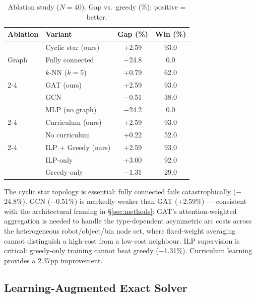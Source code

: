 \documentclass[conference]{IEEEtran}
\begin{document}
\begin{table}[htbp]
\caption{Ablation study ($N{=}40$). Gap vs.\ greedy (\%): positive = better.}
\label{tab:ablations}
\centering
\begin{tabular}{@{}llcc@{}}
\toprule
\textbf{Ablation} & \textbf{Variant} & \textbf{Gap (\%)} & \textbf{Win (\%)} \\
\midrule
\multirow{3}{*}{Graph}
    & Cyclic star (ours) & +2.59 & 93.0 \\
    & Fully connected & $-$24.8 & 0.0 \\
    & $k$-NN ($k{=}5$) & +0.79 & 62.0 \\
\cmidrule(l){2-4}
\multirow{3}{*}{Encoder}
    & GAT (ours) & +2.59 & 93.0 \\
    & GCN & $-$0.51 & 38.0 \\
    & MLP (no graph) & $-$24.2 & 0.0 \\
\cmidrule(l){2-4}
\multirow{2}{*}{Curriculum}
    & Curriculum (ours) & +2.59 & 93.0 \\
    & No curriculum & +0.22 & 52.0 \\
\cmidrule(l){2-4}
\multirow{3}{*}{Supervision}
    & ILP + Greedy (ours) & +2.59 & 93.0 \\
    & ILP-only & +3.00 & 92.0 \\
    & Greedy-only & $-$1.31 & 29.0 \\
\bottomrule
\end{tabular}
\end{table}

The cyclic star topology is essential: fully connected fails catastrophically ($-$24.8\%). GCN ($-$0.51\%) is markedly weaker than GAT ($+$2.59\%) — consistent with the architectural framing in \S\ref{sec:methods}: GAT's attention-weighted aggregation is needed to handle the type-dependent asymmetric arc costs across the heterogeneous robot/object/bin node set, where fixed-weight averaging cannot distinguish a high-cost from a low-cost neighbour. ILP supervision is critical: greedy-only training cannot beat greedy ($-$1.31\%). Curriculum learning provides a 2.37pp improvement.

\subsection{Learning-Augmented Exact Solver}\label{sec:hybrid_eval}
\end{document}
